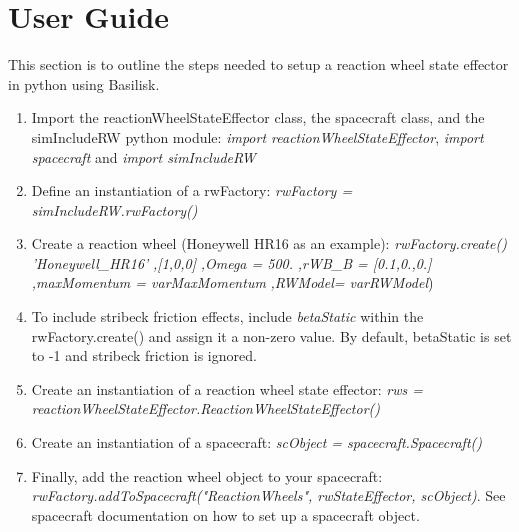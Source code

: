 \section{User Guide}

This section is to outline the steps needed to setup a reaction wheel state effector in python using Basilisk.

\begin{enumerate}
	\item Import the reactionWheelStateEffector class, the spacecraft class, and the simIncludeRW python module: \newline \textit{import reactionWheelStateEffector}, \textit{import spacecraft} and \textit{import simIncludeRW}
	\item Define an instantiation of a rwFactory: \newline
	\textit{rwFactory = simIncludeRW.rwFactory()}
	\item Create a reaction wheel (Honeywell HR16 as an example): \newline 
	\textit{rwFactory.create()} \newline
		\textit{'Honeywell\_HR16'} \newline
		\textit{,[1,0,0]} \newline
		\textit{,Omega = 500.} \newline
		\textit{,rWB\_B = [0.1,0.,0.]} \newline
		\textit{,maxMomentum = varMaxMomentum} \newline
		\textit{,RWModel= varRWModel})
	\item To include stribeck friction effects, include \textit{ betaStatic } within the rwFactory.create() and assign it a non-zero value. By default, betaStatic is set to -1 and stribeck friction is ignored. 
	\item Create an instantiation of a reaction wheel state effector: \newline \textit{rws = reactionWheelStateEffector.ReactionWheelStateEffector()}
	\item Create an instantiation of a spacecraft: \newline
	\textit{scObject = spacecraft.Spacecraft()}
	\item Finally, add the reaction wheel object to your spacecraft:\newline
	\textit{rwFactory.addToSpacecraft("ReactionWheels", rwStateEffector, scObject)}. See spacecraft documentation on how to set up a spacecraft object.
\end{enumerate}
